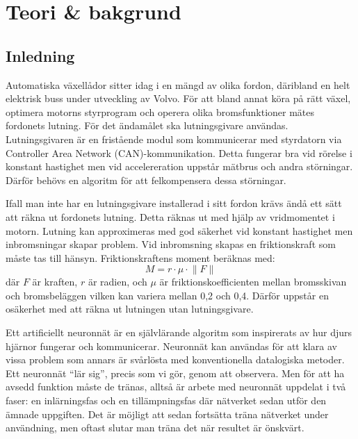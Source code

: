 \section{Teori \& bakgrund}
\subsection{Inledning}
Automatiska växellådor sitter idag i en mängd av olika fordon,
däribland en helt elektrisk buss under utveckling av Volvo.
För att bland annat köra på rätt växel, optimera motorns styrprogram
och operera olika bromsfunktioner %
mätes fordonets lutning.
För det ändamålet ska lutningsgivare användas.
Lutningsgivaren är en fristående modul som kommunicerar med styrdatorn via
Controller Area Network (CAN)-kommunikation.
Detta fungerar bra vid rörelse i konstant hastighet
men vid accelereration uppstår mätbrus och andra störningar.
Därför behövs en algoritm för att felkompensera dessa störningar.

Ifall man inte har en lutningsgivare installerad i sitt fordon krävs ändå ett
sätt att räkna ut fordonets lutning.
Detta räknas ut med hjälp av vridmomentet i motorn.
Lutning kan approximeras med god säkerhet vid konstant hastighet men inbromsningar
skapar problem.
Vid inbromsning skapas en friktionskraft som måste tas till hänsyn.
Friktionskraftens moment beräknas med:
\begin{equation}
	M = r \cdot \mu \cdot \lVert F \rVert
\end{equation}
där $F$ är kraften, $r$ är radien, och $\mu$ är friktionskoefficienten
mellan bromsskivan och bromsbeläggen vilken kan variera mellan 0,2 och 0,4.
Därför uppstår en osäkerhet med att räkna ut lutningen utan lutningsgivare.
\autocite{lauri17}

Ett artificiellt neuronnät är en självlärande algoritm som inspirerats av
hur djurs hjärnor fungerar och kommunicerar.
Neuronnät kan användas för att klara av vissa problem som annars är svårlösta
med konventionella datalogiska metoder.
Ett neuronnät ``lär sig'', precis som vi gör, genom att observera.
Men för att ha avsedd funktion måste de tränas, alltså är arbete med neuronnät
uppdelat i två faser: en inlärningsfas och en tillämpningsfas där nätverket sedan
utför den ämnade uppgiften.
\autocite{copeland16}
Det är möjligt att sedan fortsätta träna nätverket
under användning, men oftast slutar man träna det när resultet är önskvärt.
\autocite{wiki-neuronnat}

